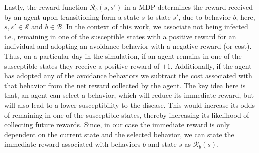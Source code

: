 \documentclass[doublespace]{VTthesis}
\begin{document}
    Lastly, the reward function $\mathcal{R}_b(s, s')$ in a MDP determines the reward received by an agent upon transitioning form a state $s$ to state $s'$, due to behavior $b$, here, $s, s' \in \mathcal{S}$ and $b \in \mathcal{B}$. In the context of this work, we associate not being infected i.e., remaining in one of the susceptible states with a positive reward for an individual and adopting an avoidance behavior with a negative reward (or cost). Thus, on a particular day in the simulation, if an agent remains in one of the susceptible states they receive a positive reward of $+1$. Additionally, if the agent has adopted any of the avoidance behaviors we subtract the cost associated with that behavior from the net reward collected by the agent. The key idea here is that, an agent can select a behavior, which will reduce its immediate reward, but will also lead to a lower susceptibility to the disease. This would increase its odds of remaining in one of the susceptible states, thereby increasing its likelihood of collecting future rewards. Since, in our case the immediate reward is only dependent on the current state and the selected behavior, we can state the immediate reward associated with behaviors $b$ and state $s$ as $\mathcal{R}_b(s)$.
\end{document}
